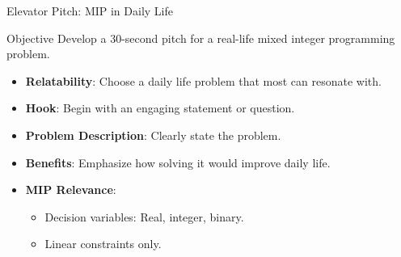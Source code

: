 \documentclass[
    NAME={Dr. Helga Ingimundardóttir},
    EMAIL={helgaingim@hi.is},
    FACULTY={Industrial Engineering},
    TITLE={Mixed Integer Programming},
    SUBTITLE={Techniques and Applications},
    SEMINAR={VÉL113F},
    DATE={Design and Optimization},
    WIDE=true
]{../HI-latex/hi-beamer}
\begin{document}
    \begin{frame}{Elevator Pitch: MIP in Daily Life}

        \begin{block}{Objective}
            Develop a 30-second pitch for a real-life mixed integer programming problem.
        \end{block}

        \begin{itemize}
            \item \textbf{Relatability}: Choose a daily life problem that most can resonate with.
            \item \textbf{Hook}: Begin with an engaging statement or question.
            \item \textbf{Problem Description}: Clearly state the problem.
            \item \textbf{Benefits}: Emphasize how solving it would improve daily life.
            \item \textbf{MIP Relevance}:
            \begin{itemize}
                \item Decision variables: Real, integer, binary.
                \item Linear constraints only.
            \end{itemize}
        \end{itemize}


\end{frame}
\end{document}
